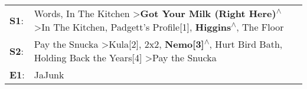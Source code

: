 \begin{supertabular}{p{0.03\textwidth}p{0.92\textwidth}}
 \textbf{S1}:  &  Words\textsuperscript{}, \enspace In The Kitchen\textsuperscript{} \textgreater \enspace \textbf{Got Your Milk (Right Here)\textsuperscript{$\wedge$}} \textgreater \enspace In The Kitchen\textsuperscript{}, \enspace Padgett's Profile[1]\textsuperscript{}, \enspace \textbf{Higgins\textsuperscript{$\wedge$}}, \enspace The Floor\textsuperscript{}  \enspace  \\
 \textbf{S2}:  &                              Pay the Snucka\textsuperscript{} \textgreater \enspace Kula[2]\textsuperscript{}, \enspace 2x2\textsuperscript{}, \enspace \textbf{Nemo[3]\textsuperscript{$\wedge$}}, \enspace Hurt Bird Bath\textsuperscript{}, \enspace Holding Back the Years[4]\textsuperscript{} \textgreater \enspace Pay the Snucka\textsuperscript{}  \enspace  \\
 \textbf{E1}:  &                                                                                                                                                                                                                                                                                                                                   JaJunk\textsuperscript{}  \enspace  \\
\end{supertabular}
